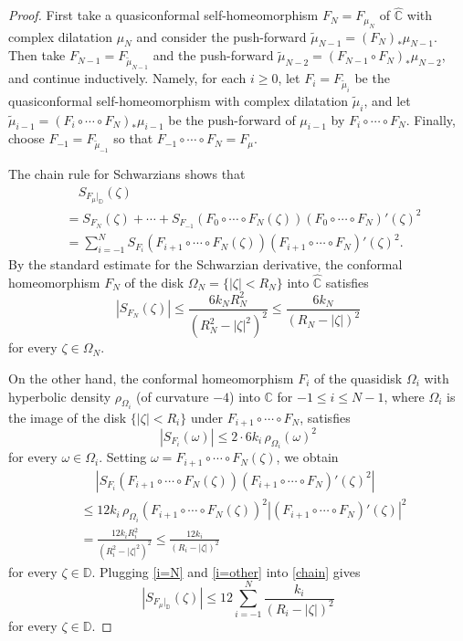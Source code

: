 \documentclass[amstex]{amsart}
\theoremstyle{definition}
\theoremstyle{remark}
\numberwithin{equation}{section}
\begin{document}
\begin{proof}
First take a quasiconformal self-homeomorphism $F_{N}=F_{\mu_{N}}$ of $\widehat{\mathbb C}$ with complex dilatation 
$\mu_{N}$ and consider the push-forward $\tilde \mu_{N-1}=(F_{N})_* \mu_{N-1}$.
Then take 
$F_{N-1}=F_{\tilde \mu_{N-1}}$ and the push-forward 
$\tilde \mu_{N-2}=(F_{N-1}\circ F_{N})_* \mu_{N-2}$,
and continue inductively. Namely, for each $i \geq 0$,
let $F_{i}=F_{\tilde \mu_{i}}$ be the quasiconformal self-homeomorphism with complex dilatation 
$\tilde \mu_{i}$, and let 
$\tilde \mu_{i-1}=(F_{i}\circ \cdots \circ F_{N})_* \mu_{i-1}$ be the push-forward 
of $\mu_{i-1}$ by $F_{i}\circ \cdots \circ F_{N}$.
Finally, choose $F_{-1}=F_{\tilde \mu_{-1}}$ so that 
$F_{-1} \circ \cdots \circ F_{N}=F_\mu$.

The chain rule for Schwarzians shows that
\begin{align}\label{chain}
&\quad S_{F_\mu|_{\mathbb D}}(\zeta)\\
&=S_{F_{N}}(\zeta)+ \cdots +
S_{F_{-1}}(F_{0} \circ \cdots \circ F_{N}(\zeta))(F_{0} \circ \cdots \circ F_{N})'(\zeta)^2\\
&=
\sum_{i=-1}^{N} S_{F_i}(F_{i+1} \circ \cdots \circ F_{N}(\zeta))(F_{i+1} \circ \cdots \circ F_{N})'(\zeta)^2.
\end{align}
By the standard estimate for the Schwarzian derivative,
the conformal homeomorphism $F_{N}$ of the disk 
$\Omega_{N}=\{|\zeta|<R_{N}\}$ into $\widehat{\mathbb C}$ satisfies 
\begin{equation}\label{i=N}
|S_{F_{N}}(\zeta)|
\leq \frac{6k_{N}R_{N}^2}{(R_{N}^2-|\zeta|^2)^2} \leq \frac{6k_{N}}{(R_{N}-|\zeta|)^2}
\end{equation}
for every $\zeta \in \Omega_{N}$.

On the other hand, the conformal homeomorphism $F_{i}$ of the 
quasidisk $\Omega_i$ with hyperbolic density $\rho_{\Omega_i}$ (of curvature $-4$) into $\mathbb C$ for $-1 \leq i \leq N-1$, 
where $\Omega_i$ is the image of the disk $\{|\zeta|<R_i\}$ under
$F_{i+1} \circ \cdots \circ F_{N}$, satisfies 
$$
|S_{F_i}(\omega)| \leq 2 \cdot 6k_i\, \rho_{\Omega_i}(\omega)^2
$$
for every $\omega \in \Omega_i$.
Setting $\omega=F_{i+1} \circ \cdots \circ F_{N}(\zeta)$, we obtain
\begin{align}\label{i=other}
&\quad \ |S_{F_i}(F_{i+1} \circ \cdots \circ F_{N}(\zeta))(F_{i+1} \circ \cdots \circ F_{N})'(\zeta)^2|\\
&\leq 12k_i \,\rho_{\Omega_i}(F_{i+1} \circ \cdots \circ F_{N}(\zeta))^2|(F_{i+1} 
\circ \cdots \circ F_{N})'(\zeta)|^2\\
&=\frac{12k_i R_i^2}{(R_i^2-|\zeta|^2)^2} \leq  \frac{12k_i}{(R_i-|\zeta|)^2}
\end{align}
for every $\zeta \in \mathbb D$.
Plugging \eqref{i=N} and \eqref{i=other} into \eqref{chain} gives
$$
|S_{F_\mu|_\mathbb D}(\zeta)| \leq 12 \sum_{i=-1}^{N} \frac{k_i}{(R_i-|\zeta|)^2}
$$
for every $\zeta \in \mathbb D$.
\end{proof}
\medskip
\end{document}
